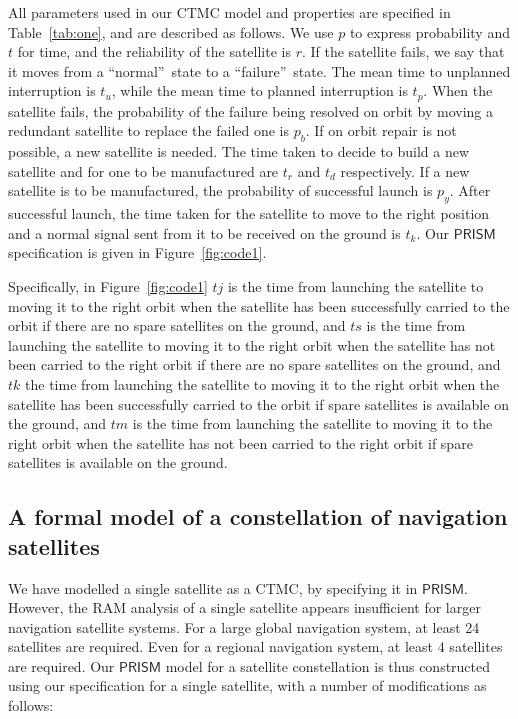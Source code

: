 \documentclass[preprint,12pt]{qrei}
\begin{document}
All parameters used in our CTMC model and properties are specified in Table~\ref{tab:one}, and are described as follows. We use $p$ to express probability and $t$ for time, and the reliability of the satellite is $r$. If the satellite fails, we say that it moves from a \textquotedblleft normal\textquotedblright\ state to a \textquotedblleft failure\textquotedblright\ state. The mean time to unplanned interruption is $t_{u}$, while the mean time to planned interruption is $t_{p}$. When the satellite fails, the probability of the failure being resolved on orbit by moving a redundant satellite to replace the failed one is $p_{b}$. If on orbit repair is not possible, a new satellite is needed. The time taken to decide to build a new satellite and for one to be manufactured are $t_{r}$ and $t_{d}$ respectively. If a new satellite is to be manufactured, the probability of successful launch is $p_{y}$. After successful launch, the time taken for the satellite to move to the right position and a normal signal sent from it to be received on the ground is $t_{k}$. Our $\mathsf{PRISM}$ specification is given in Figure~\ref{fig:code1}.

Specifically, in Figure~\ref{fig:code1} $tj$ is the time from launching the satellite to moving it to the right orbit when the satellite has been successfully carried to the orbit if there are no spare satellites on the ground, and $ts$ is the time from launching the satellite to moving it to the right orbit when the satellite has not been carried to the right orbit if there are no spare satellites on the ground, and $tk$ the time from launching the satellite to moving it to the right orbit when the satellite has been successfully carried to the orbit if spare satellites is available on the ground, and $tm$ is the time from launching the satellite to moving it to the right orbit when the satellite has not been carried to the right orbit if spare satellites is available on the ground.

\subsection{A formal model of a constellation of navigation satellites}

We have modelled a single satellite as a CTMC, by specifying it in $\mathsf{PRISM}$. However, the RAM analysis of a single satellite appears insufficient for larger navigation satellite systems. For a large global navigation system, at least 24 satellites are required. Even for a regional navigation system, at least 4 satellites are required. Our $\mathsf{PRISM}$ model for a satellite constellation is thus constructed using our specification for a single satellite, with a number of modifications as follows:
\end{document}
